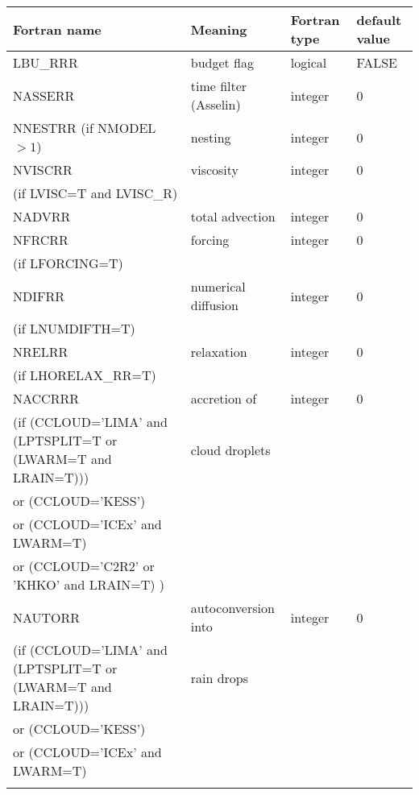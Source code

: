 \begin{longtable} {|p{}|p{}|>{\centering}p{}|p{}<{\centering}|}
\hline
Fortran name & Meaning & Fortran type & default value \\
\hline \hline
\endhead
LBU\_RRR & budget flag & logical & FALSE\index{LBU\_RRR!\innam{NAM\_BU\_RRR}} \\\hline
NASSERR  & time filter (Asselin)   & integer  &  0 \index{NASSERR!\innam{NAM\_BU\_RRR}} \\\hline
NNESTRR (if NMODEL$>1$) & nesting           & integer  &  0 \index{NNESTRR!\innam{NAM\_BU\_RRR}} \\\hline
NVISCRR  & viscosity         & integer  &  0 \index{NVISCRR!\innam{NAM\_BU\_RRR}}\\
(if LVISC=T and LVISC\_R) &  &   &   \\\hline
NADVRR   & total advection   & integer  &  0 \index{NADVRR!\innam{NAM\_BU\_RRR}}\\\hline
NFRCRR   & forcing           & integer  &  0 \index{NFRCRR!\innam{NAM\_BU\_RRR}} \\ \nopagebreak
(if LFORCING=T) &  &   &   \\\hline
NDIFRR   & numerical diffusion & integer  &  0 \index{NDIFRR!\innam{NAM\_BU\_RRR}}\\ \nopagebreak
(if LNUMDIFTH=T) &  &   &   \\\hline
NRELRR   & relaxation        & integer  &  0 \index{NRELRR!\innam{NAM\_BU\_RRR}}\\ \nopagebreak
(if LHORELAX\_RR=T) &  &   &   \\\hline
NACCRRR  & accretion of & integer  &  0 \index{NACCRRR!\innam{NAM\_BU\_RRR}}\\ \nopagebreak
(if (CCLOUD='LIMA' and (LPTSPLIT=T or (LWARM=T and LRAIN=T))) & cloud droplets & & \\ \nopagebreak
 or (CCLOUD='KESS') & & & \\ \nopagebreak
 or (CCLOUD='ICEx' and LWARM=T) & & & \\ \nopagebreak
 or (CCLOUD='C2R2' or 'KHKO' and LRAIN=T) ) & & & \\ \hline
NAUTORR   & autoconversion into & integer  &  0 \index{NAUTORR!\innam{NAM\_BU\_RRR}}\\ \nopagebreak
(if (CCLOUD='LIMA' and (LPTSPLIT=T or (LWARM=T and LRAIN=T))) & rain drops & & \\ \nopagebreak
 or (CCLOUD='KESS') & & & \\ \nopagebreak
 or (CCLOUD='ICEx' and LWARM=T) & & & \\ \nopagebreak

\end{longtable}
